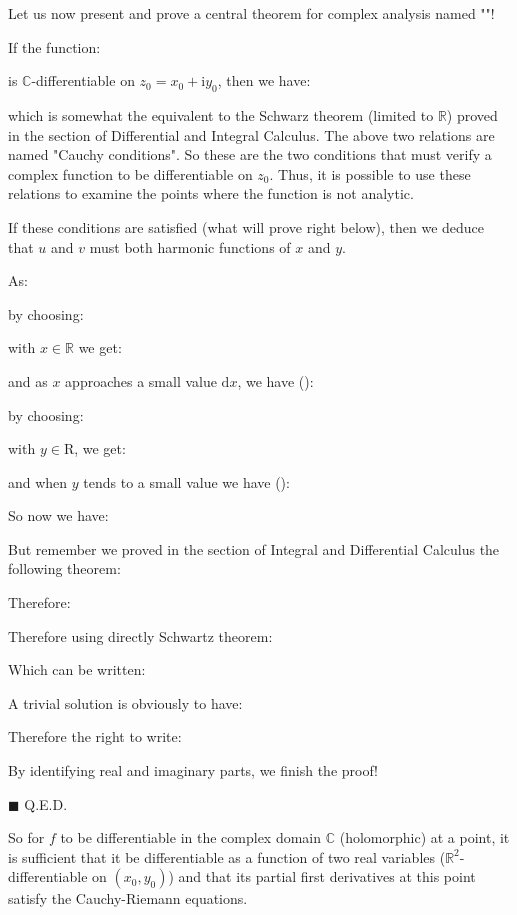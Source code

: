 	Let us now present and prove a central theorem for complex analysis named ""!
	
	If the function:
	
	is $\mathbb{C}$-differentiable on $z_0=x_0+\mathrm{i}y_0$, then we have:
	
	which is somewhat the equivalent to the Schwarz theorem (limited to $\mathbb{R}$) proved in the section of Differential and Integral Calculus. The above two relations are named "Cauchy conditions". So these are the two conditions that must verify a complex function to be differentiable on $z_0$. Thus, it is possible to use these relations to examine the points where the function is not analytic.
	
	\begin{theorem}
	If these conditions are satisfied (what will prove right below), then we deduce that $u$ and $v$ must both harmonic functions of $x$ and $y$.
	\end{theorem}
	\begin{dem}
	As:
	
	by choosing:
	
	with $x \in \mathbb{R}$ we get:
	
	and as $x$ approaches a small value $\mathrm{d}x$, we have ():
	
	by choosing:
	
	with $y \in \mathrm{R}$, we get:
	
	and when $y$ tends to a small value we have ():
	
	So now we have:
	
	But remember we proved in the section of Integral and Differential Calculus the following theorem:
	
	Therefore:
	
	Therefore using directly Schwartz theorem:
	
	Which can be written:
	
	A trivial solution is obviously to have:
	
	Therefore the right to write:
	
	By identifying real and imaginary parts, we finish the proof!
	\begin{flushright}
		$\blacksquare$  Q.E.D.
	\end{flushright}
	\end{dem}
	So for $f$ to be differentiable in the complex domain $\mathbb{C}$ (holomorphic) at a point, it is sufficient that it be differentiable as a function of two real variables ($\mathbb{R}^2$-differentiable on $(x_0,y_0)$) and that its partial first derivatives at this point satisfy the Cauchy-Riemann equations.
	
